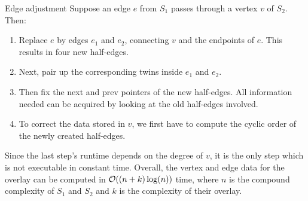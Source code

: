     \begin{outline}{Edge adjustment}
        Suppose an edge $e$ from $S_1$ passes through a vertex $v$ of $S_2$. Then:
        \begin{enumerate}
            \item Replace $e$ by edges $e_1$ and $e_2$, connecting $v$ and the endpoints of $e$. This results in four new half-edges.
            
            \item Next, pair up the corresponding twins inside $e_1$ and $e_2$.
            
            \item Then fix the next and prev pointers of the new half-edges. All information needed can be acquired by looking at the old half-edges involved.
            
            \item To correct the data stored in $v$, we first have to compute the cyclic order of the newly created half-edges. 
        \end{enumerate}
    \end{outline}

    \begin{remark}
        Since the last step's runtime depends on the degree of $v$, it is the only step which is not executable in constant time. Overall, the vertex and edge data for the overlay can be computed in $\mathcal{O}((n + k)\log(n))$ time, where $n$ is the compound complexity of $S_1$ and $S_2$ and $k$ is the complexity of their overlay.
    \end{remark} \ \\ 

